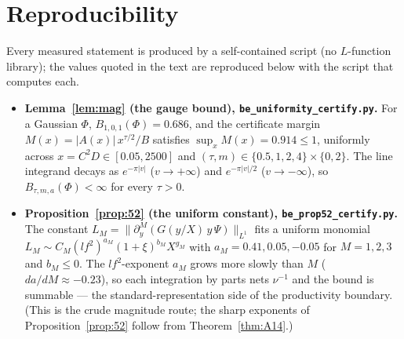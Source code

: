 \documentclass[11pt]{article}
\theoremstyle{definition}
\begin{document}
\appendix
\section{Reproducibility}\label{app:repro}

Every measured statement is produced by a self-contained script (no $L$-function library); the values
quoted in the text are reproduced below with the script that computes each.

\begin{itemize}
\item \textbf{Lemma~\ref{lem:mag} (the gauge bound), \texttt{be\_uniformity\_certify.py}.} For a
Gaussian $\Phi$, $B_{1,0,1}(\Phi)=0.686$, and the certificate margin
$M(x)=|A(x)|\,x^{\tau/2}/B$ satisfies $\sup_x M(x)=0.914\le1$, uniformly across $x=C^2D\in[0.05,2500]$
and $(\tau,m)\in\{0.5,1,2,4\}\times\{0,2\}$. The line integrand decays as $e^{-\pi|v|}$ ($v\to+\infty$)
and $e^{-\pi|v|/2}$ ($v\to-\infty$), so $B_{\tau,m,a}(\Phi)<\infty$ for every $\tau>0$.

\item \textbf{Proposition~\ref{prop:52} (the uniform constant), \texttt{be\_prop52\_certify.py}.} The
constant $L_M=\|\partial_y^M(G(y/X)\,y\,\Psi)\|_{L^1}$ fits a uniform monomial
$L_M\sim C_M(lf^2)^{a_M}(1+\xi)^{b_M}X^{g_M}$ with $a_M=0.41,0.05,-0.05$ for $M=1,2,3$ and $b_M\le0$.
The $lf^2$-exponent $a_M$ grows more slowly than $M$ ($da/dM\approx-0.23$), so each integration by
parts nets $\nu^{-1}$ and the bound is summable --- the standard-representation side of the
productivity boundary. (This is the crude magnitude route; the sharp exponents of
Proposition~\ref{prop:52} follow from Theorem~\ref{thm:A14}.)


\end{itemize}
\end{document}
